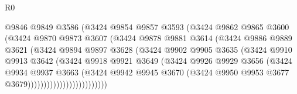 \begin{lexlean}{R0}
\begin{coremodule}
                            @9846
                            @9849
                            @3586
                            (@3424
                              @9854
                              @9857
                              @3593
                              (@3424
                                @9862
                                @9865
                                @3600
                                (@3424
                                  @9870
                                  @9873
                                  @3607
                                  (@3424
                                    @9878
                                    @9881
                                    @3614
                                    (@3424
                                      @9886
                                      @9889
                                      @3621
                                      (@3424
                                        @9894
                                        @9897
                                        @3628
                                        (@3424
                                          @9902
                                          @9905
                                          @3635
                                          (@3424
                                            @9910
                                            @9913
                                            @3642
                                            (@3424
                                              @9918
                                              @9921
                                              @3649
                                              (@3424
                                                @9926
                                                @9929
                                                @3656
                                                (@3424
                                                  @9934
                                                  @9937
                                                  @3663
                                                  (@3424
                                                    @9942
                                                    @9945
                                                    @3670
                                                    (@3424
                                                      @9950
                                                      @9953
                                                      @3677
                                                      @3679)))))))))))))))))))))))))

\end{coremodule}
\end{lexlean}
